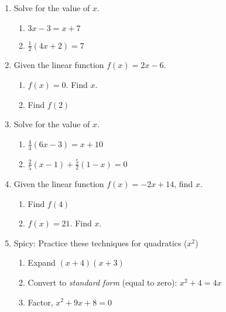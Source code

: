 \begin{enumerate}
\item Solve for the value of $x$.
  \begin{multicols}{2}
    \begin{enumerate}
      \item   $3x-3=x + 7$ \vspace{6cm}
      \item   $\frac{1}{2}(4x+2)=7$ \vspace{6cm}
    \end{enumerate}
  \end{multicols}
  \vspace{5cm}

\item Given the linear function $f(x)=2x-6$.
\begin{multicols}{2}
  \begin{enumerate}
    \item   $f(x)=0$. Find $x$. \vspace{6cm}
    \item Find $f(2)$ \vspace{6cm}
  \end{enumerate}
\end{multicols}
  \vspace{6cm}

\item Solve for the value of $x$.
  \begin{multicols}{2}
    \begin{enumerate}
      \item   $\frac{4}{3}(6x-3)=x + 10$
      \item   $\frac{2}{5}(x-1)+\frac{5}{2}(1-x)=0$
    \end{enumerate}
  \end{multicols}
  \vspace{6cm}

\item Given the linear function $f(x)=-2x+14$, find $x$.
\begin{multicols}{2}
  \begin{enumerate}
    \item Find $f(4)$
    \item   $f(x)=21$. Find $x$.
  \end{enumerate}
\end{multicols} \vspace{4cm}

\item Spicy: Practice these techniques for quadratics ($x^2$)
  \begin{enumerate}[itemsep=2cm]
    \item Expand $(x+4)(x+3)$
    \item Convert to \emph{standard form} (equal to zero): $x^2+4=4x$
    \item Factor, $x^2+9x+8=0$
  \end{enumerate}
  

\end{enumerate}
